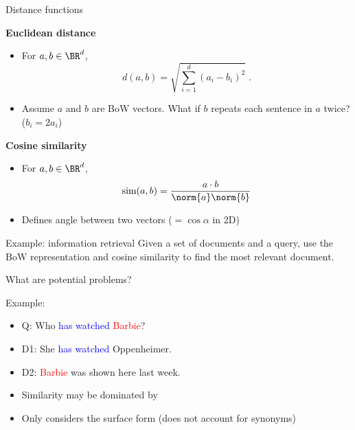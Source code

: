 \documentclass[usenames,dvipsnames,notes,11pt,aspectratio=169]{beamer}
\begin{document}
\begin{frame}
    {Distance functions}

    \textbf{Euclidean distance}\\
    \begin{itemize}
        \item[] For $a,b\in\BR^d$,
            $$
            d(a,b) = \sqrt{\sum_{i=1}^d(a_i-b_i)^2} \;.
            $$
            \pause
        \item[] Assume $a$ and $b$ are BoW vectors. What if $b$ repeats each sentence in $a$ twice?
            \pause ($b_i=2a_i$)
    \end{itemize}

    \pause
    \textbf{Cosine similarity}\\
    \begin{itemize}
        \item[] For $a,b\in\BR^d$,
            $$
            \text{sim}(a,b) = \frac{a\cdot b}{\norm{a}\norm{b}}
            $$
        \item[] Defines angle between two vectors ($ = \cos\alpha$ in 2D) 
    \end{itemize}
\end{frame}

\begin{frame}
    {Example: information retrieval}
    Given a set of documents and a query,
    use the BoW representation and cosine similarity
    to find the most relevant document.

    What are potential problems?

    Example:\\
    \begin{itemize}
        \item[] Q: Who \textcolor{blue}{has watched} \textcolor{red}{Barbie}?
        \item[] D1: She \textcolor{blue}{has} \textcolor{blue}{watched} Oppenheimer.
        \item[] D2: \textcolor{red}{Barbie} was shown here last week.
    \end{itemize}

    \pause
    \begin{itemize}
        \item Similarity may be dominated by 
        \item Only considers the surface form (\eg does not account for synonyms)
    \end{itemize}
    
\end{frame}
\end{document}

